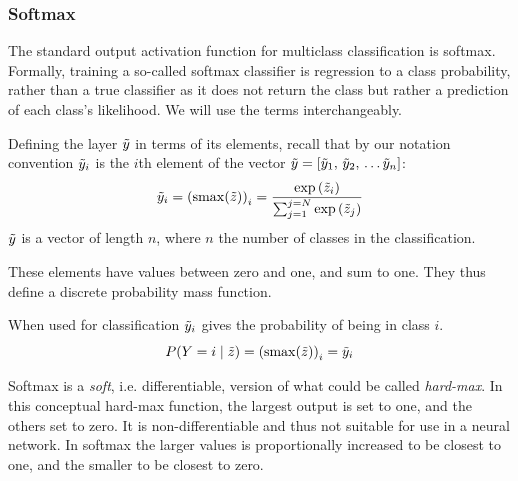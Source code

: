 \documentclass[12pt,parskip]{komatufte}
\begin{document}
\subsubsection{Softmax}
The standard output activation function for multiclass classification is softmax.
Formally, training a so-called softmax classifier is regression to a class probability, rather than a true classifier as it does not return the class but rather a prediction of each class's likelihood.
We will use the terms interchangeably.



Defining the layer $\tilde{y}$ in terms of its elements,
recall that by our notation convention $\iv y_i$ is the $i$th element of the vector $\v y=\left[\iv y_1,\,\iv y_2,\,\ldots \iv y_n\right]$:
\begin{equation}
\iv y_i=\i {\left(\softmax(\v z)\right)}_i= \frac{\exp{\iv z_i}}{\sum_{j=1}^{j=N} \exp{\iv z_j}}
\end{equation}
$\tilde{y}$ is a vector of length $n$, where $n$ the number of classes in the classification.

These elements have  values between zero and one, and sum to one.
They thus define a discrete probability mass function.

When used for classification $\tilde{y}_i$ gives the probability of being in class $i$.
\begin{equation}
P(Y=i\mid \v z) = \i {\left(\softmax(\v z)\right)}_i  = \iv y_i
\end{equation}


Softmax is a \emph{soft}, i.e. differentiable,  version of what could be called \emph{hard-max}.
In this conceptual hard-max function, the largest output is set to one, and the others set to zero.
It is non-differentiable and thus not suitable for use in a neural network.
In softmax the larger values is proportionally increased to be closest to one,
and the smaller to be closest to zero.
\end{document}

